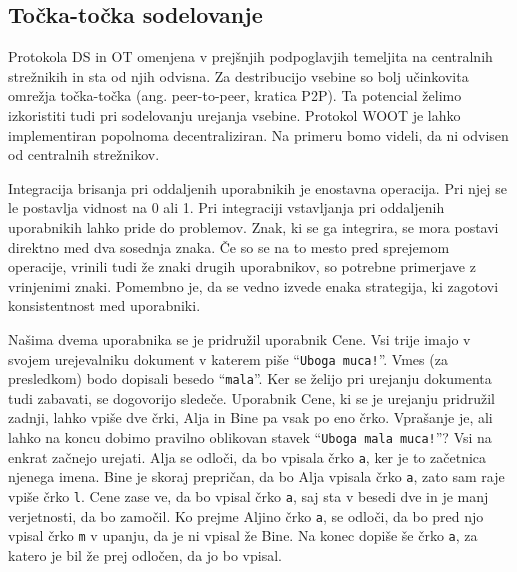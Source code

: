 \documentclass[a4paper, 12pt, twoside]{book}
\begin{document}
\subsection{Točka-točka sodelovanje}

Protokola DS in OT omenjena v prejšnjih podpoglavjih temeljita na centralnih strežnikih in sta od njih odvisna. Za destribucijo vsebine so bolj učinkovita omrežja točka-točka (ang. peer-to-peer, kratica P2P). Ta potencial želimo izkoristiti tudi pri sodelovanju urejanja vsebine. Protokol WOOT je lahko implementiran popolnoma decentraliziran. Na primeru bomo videli, da ni odvisen od centralnih strežnikov.

Integracija brisanja pri oddaljenih uporabnikih je enostavna operacija. Pri njej se le postavlja vidnost na 0 ali 1. Pri integraciji vstavljanja pri oddaljenih uporabnikih lahko pride do problemov. Znak, ki se ga integrira, se mora postavi direktno med dva sosednja znaka. Če so se na to mesto pred sprejemom operacije, vrinili tudi že znaki drugih uporabnikov, so potrebne primerjave z vrinjenimi znaki. Pomembno je, da se vedno izvede enaka strategija, ki zagotovi konsistentnost med uporabniki.

Našima dvema uporabnika se je pridružil uporabnik Cene. Vsi trije imajo v svojem urejevalniku dokument v katerem piše “{\tt Uboga muca!}”. Vmes (za presledkom) bodo dopisali besedo “{\tt mala}”. Ker se želijo pri urejanju dokumenta tudi zabavati, se dogovorijo sledeče. Uporabnik Cene, ki se je urejanju pridružil zadnji, lahko vpiše dve črki, Alja in Bine pa vsak po eno črko. Vprašanje je, ali lahko na koncu dobimo pravilno oblikovan stavek “{\tt Uboga mala muca!}”?
Vsi na enkrat začnejo urejati. Alja se odloči, da bo vpisala črko {\tt a}, ker je to začetnica njenega imena. Bine je skoraj prepričan, da bo Alja vpisala črko {\tt a}, zato sam raje vpiše črko {\tt l}. Cene zase ve, da bo vpisal črko {\tt a}, saj sta v besedi dve in je manj verjetnosti, da bo zamočil. Ko prejme Aljino črko {\tt a}, se odloči, da bo pred njo vpisal črko {\tt m} v upanju, da je ni vpisal že Bine. Na konec dopiše še črko {\tt a}, za katero je bil že prej odločen, da jo bo vpisal.
\end{document}
